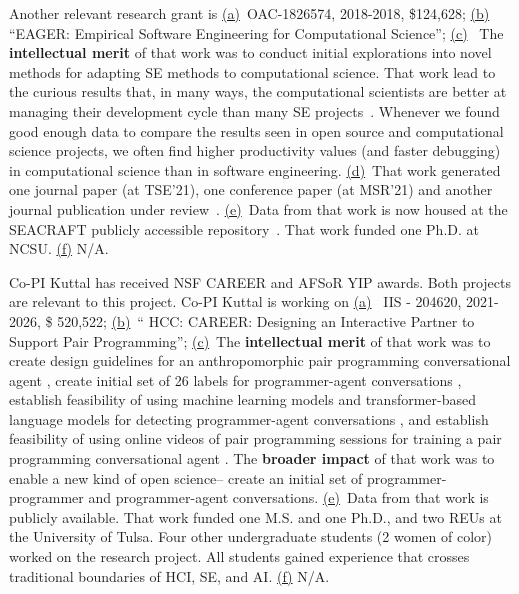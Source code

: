 \documentclass[twoside]{NSF}
\begin{document}
\begin{nsfdescription}
Another relevant research grant is 
\underline{(a)}~OAC-1826574, 2018-2018, 
\$124,628;
\underline{(b)}~
``EAGER: Empirical Software Engineering for Computational Science'';
\underline{(c)}~ 
The {\bf intellectual merit} of that work was to
conduct initial explorations into novel methods for adapting SE methods to computational science.
That work lead to the curious
results that, in many ways,
the computational scientists are better
at managing their development cycle
than many SE projects~\cite{tu2020changing}. Whenever
we found good enough data to compare the results
seen in open source and computational
science projects, we often find higher productivity
values (and faster debugging) in computational science
than in software engineering. 
\underline{(d)}~That work generated 
one journal paper (at TSE'21),
one conference paper (at MSR'21) and another journal publication under review~\cite{Ling21}.
 \underline{(e)}~Data from that work is now housed at the SEACRAFT publicly accessible repository~\cite{menzies2017seacraft}. That work  funded one Ph.D. at NCSU. 
 \underline{(f)} N/A.  
 
 
 Co-PI Kuttal has received NSF CAREER and AFSoR YIP awards. Both projects are relevant to this project. Co-PI Kuttal is working on 
\underline{(a)}~ IIS - 204620, 2021-2026, \$ 520,522;
 \underline{(b)}~`` HCC: CAREER: Designing an Interactive Partner to Support Pair Programming''; 
\underline{(c)}~The {\bf intellectual merit} of that work was to create design guidelines for an anthropomorphic pair programming conversational agent \cite{Kuttal2020, Kuttal2021,tochipaper}, create initial set of 26 labels for programmer-agent conversations \cite{RobeFSE2022}, establish feasibility of using machine learning models\cite{Robe2020} and transformer-based language models for detecting programmer-agent conversations \cite{RobeFSE2022}, and establish feasibility of using online videos of pair programming sessions for training a pair programming conversational agent \cite{Hartposter2022, Alexposter2022}. 
The {\bf broader impact} of that work was to
enable a new kind of open science-- create an initial set of programmer-programmer and programmer-agent conversations.
\underline{(e)}~Data from that work is publicly available. That work funded one M.S. and one Ph.D., and two REUs at the University of Tulsa. Four other undergraduate students (2 women of color) worked on the research project. All students gained experience that crosses traditional boundaries of HCI, SE, and AI.
\underline{(f)}
N/A.



\end{nsfdescription}
\end{document}
